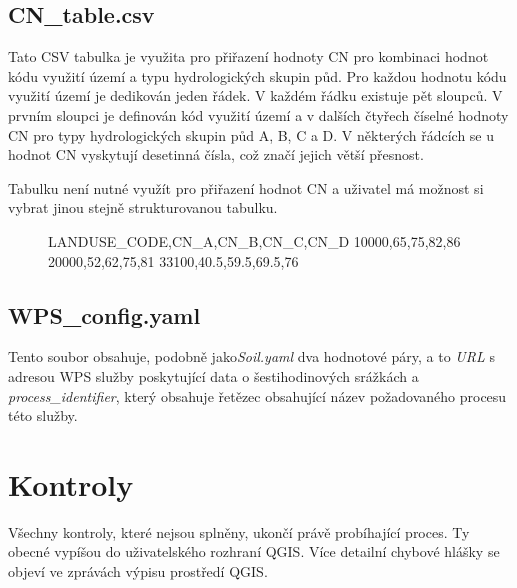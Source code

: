 \documentclass[a4paper,oneside,12pt]{book}
\begin{document}
\subsection*{CN\_table.csv} \label{CN_table.csv}
\hspace{10mm} Tato CSV tabulka je využita pro přiřazení hodnoty CN pro kombinaci hodnot kódu využití území a typu hydrologických skupin půd. Pro každou hodnotu kódu využití území je dedikován jeden řádek. V každém řádku existuje pět sloupců. V prvním sloupci je definován kód využití území a v dalších čtyřech číselné hodnoty CN pro typy hydrologických skupin půd A, B, C a D. V některých řádcích se u hodnot CN vyskytují desetinná čísla, což značí jejich větší přesnost.

\hspace{10mm} Tabulku není nutné využít pro přiřazení hodnot CN a uživatel má možnost si vybrat jinou stejně strukturovanou tabulku.

\begin{figure}[H]
\begin{pythoncode}[style=mypython, caption={Ukázka CN\_table.csv},label={kod:CN_table.csv}]
LANDUSE_CODE,CN_A,CN_B,CN_C,CN_D
10000,65,75,82,86
20000,52,62,75,81
33100,40.5,59.5,69.5,76
\end{pythoncode}
\end{figure}

\subsection*{WPS\_config.yaml} \label{WPS_config.yaml}
\hspace{10mm} Tento soubor obsahuje, podobně jako\textit{Soil.yaml} dva hodnotové páry, a to \textit{URL} s adresou WPS služby poskytující data o šestihodinových srážkách a \textit{process\_identifier}, který obsahuje řetězec obsahující název požadovaného procesu této služby.

\section{Kontroly} \label{checks}
\hspace{10mm} Všechny kontroly, které nejsou splněny, ukončí právě probíhající proces. Ty obecné vypíšou do uživatelského rozhraní QGIS. Více detailní chybové hlášky se objeví ve zprávách výpisu prostředí QGIS.
\end{document}
